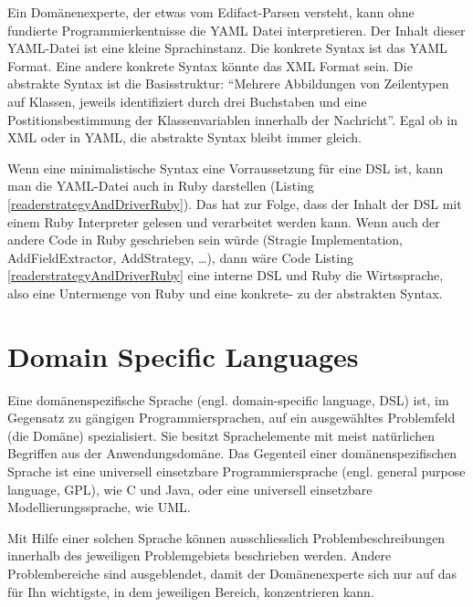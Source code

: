 \documentclass[11pt,english,ngerman, headsepline]{scrreprt}
\begin{document}
Ein Domänenexperte, der etwas vom Edifact-Parsen versteht, kann ohne fundierte
Programmierkentnisse die YAML Datei interpretieren.
Der Inhalt dieser YAML-Datei ist eine kleine Sprachinstanz. Die
konkrete Syntax ist das YAML Format. Eine andere konkrete Syntax könnte
das XML Format sein. Die abstrakte Syntax ist die Basisstruktur: ``Mehrere
Abbildungen von Zeilentypen auf Klassen, jeweils identifiziert durch drei
Buchstaben und eine Postitionsbestimmung der Klassenvariablen innerhalb der
Nachricht''.
Egal ob in XML oder in YAML, die abstrakte Syntax bleibt immer gleich.

Wenn eine minimalistische Syntax eine Vorraussetzung für eine DSL ist, kann man
die YAML-Datei auch in Ruby darstellen (Listing
\ref{readerstrategyAndDriverRuby}). Das hat zur Folge, dass der Inhalt der DSL
mit einem Ruby Interpreter gelesen und verarbeitet werden kann. Wenn auch der
andere Code in Ruby geschrieben sein würde (Stragie Implementation,
AddFieldExtractor, AddStrategy, \ldots), dann wäre Code Listing
\ref{readerstrategyAndDriverRuby} eine interne DSL und Ruby die Wirtssprache,
also eine Untermenge von Ruby und eine konkrete- zu der abstrakten Syntax.
 




\section{Domain Specific Languages}
  
Eine domänenspezifische Sprache (engl. domain-specific language, DSL) ist, im
Gegensatz zu gängigen Programmiersprachen, auf ein ausgewähltes
 Problemfeld (die Domäne) spezialisiert. Sie besitzt
Sprachelemente mit meist natürlichen Begriffen aus der Anwendungsdomäne.
Das Gegenteil einer domänenspezifischen Sprache ist eine universell einsetzbare
Programmiersprache (engl. general purpose language, GPL), wie C und Java, oder
eine universell einsetzbare Modellierungssprache, wie UML.

Mit Hilfe einer solchen Sprache können ausschliesslich Problembeschreibungen
innerhalb des jeweiligen Problemgebiets beschrieben werden.
Andere Problembereiche sind ausgeblendet, damit der Domänenexperte sich
nur auf das für Ihn wichtigste, in dem jeweiligen Bereich, konzentrieren kann.
\end{document}
